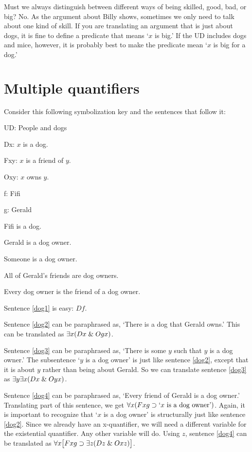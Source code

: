 Must we always distinguish between different ways of being skilled, good, bad, or big? No. As the argument about Billy shows, sometimes we only need to talk about one kind of skill. If you are translating an argument that is just about dogs, it is fine to define a predicate that means `$x$ is big.' If the UD includes dogs and mice, however, it is probably best to make the predicate mean `$x$ is big for a dog.'


\section{Multiple quantifiers}
Consider this following symbolization key and the sentences that follow it:
\begin{ekey}
\item{UD:} People and dogs
\item{Dx:} $x$ is a dog.
\item{Fxy:} $x$ is a friend of $y$.
\item{Oxy:} $x$ owns $y$.
\item{f:} Fifi
\item{g:} Gerald
\end{ekey}

\begin{earg}
\item[\ex{dog1}] Fifi is a dog.
\item[\ex{dog2}] Gerald is a dog owner.
\item[\ex{dog3}] Someone is a dog owner.
\item[\ex{dog4}] All of Gerald's friends are dog owners.
\item[\ex{dog5}] Every dog owner is the friend of a dog owner.
\end{earg}

Sentence \ref{dog1} is easy: $Df$.

Sentence \ref{dog2} can be paraphrased as, `There is a dog that Gerald owns.' This can be translated as $\exists x(Dx \mathrel\& Ogx)$.

Sentence \ref{dog3} can be paraphrased as, `There is some $y$ such that $y$ is a dog owner.' The subsentence `$y$ is a dog owner' is just like sentence \ref{dog2}, except that it is about $y$ rather than being about Gerald. So we can translate sentence \ref{dog3} as $\exists y \exists x(Dx \mathrel\& Oyx)$. 

Sentence \ref{dog4} can be paraphrased as, `Every friend of Gerald is a dog owner.' Translating part of this sentence, we get $\forall x(Fxg \supset\mbox{`$x$ is a dog owner'})$. Again, it is important to recognize that `$x$ is a dog owner' is structurally just like sentence \ref{dog2}. Since we already have an x-quantifier, we will need a different variable for the existential quantifier. Any other variable will do. Using $z$, sentence \ref{dog4} can be translated as $\forall x\bigl[Fxg \supset\exists z(Dz \mathrel\& Oxz)\bigr]$.


